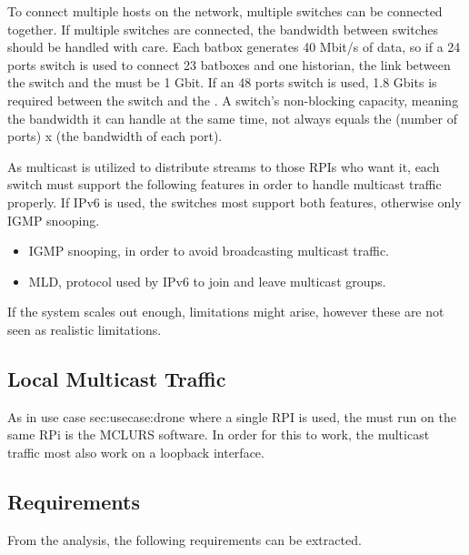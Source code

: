 To connect multiple hosts on the network, multiple switches can be connected together. If multiple switches are connected, the bandwidth between switches should be handled with care. Each batbox generates 40 Mbit/s of data, so if a 24 ports switch is used to connect 23 batboxes and one historian, the link between the switch and the  must be 1 Gbit. If an 48 ports switch is used, 1.8 Gbits is required between the switch and the . A switch's non-blocking capacity, meaning the bandwidth it can handle at the same time, not always equals the (number of ports) x (the bandwidth of each port).

As multicast is utilized to distribute streams to those RPIs who want it, each switch must support the following features in order to handle multicast traffic properly. If IPv6 is used, the switches most support both features, otherwise only IGMP snooping.

\begin{itemize}
	 \item IGMP snooping, in order to avoid broadcasting multicast traffic.
	 \item MLD, protocol used by IPv6 to join and leave multicast groups.
\end{itemize}

If the system scales out enough, limitations might arise, however these are not seen as realistic limitations.

\subsection{Local Multicast Traffic} \label{sec:analysis:localmulticasttrafic}
As in use case \refname{sec:usecase:drone} where a single RPI is used, the  must run on the same RPi is the \ac{MCLURS} software. In order for this to work, the multicast traffic most also work on a loopback interface. 

\subsection{Requirements}
From the analysis, the following requirements can be extracted.
